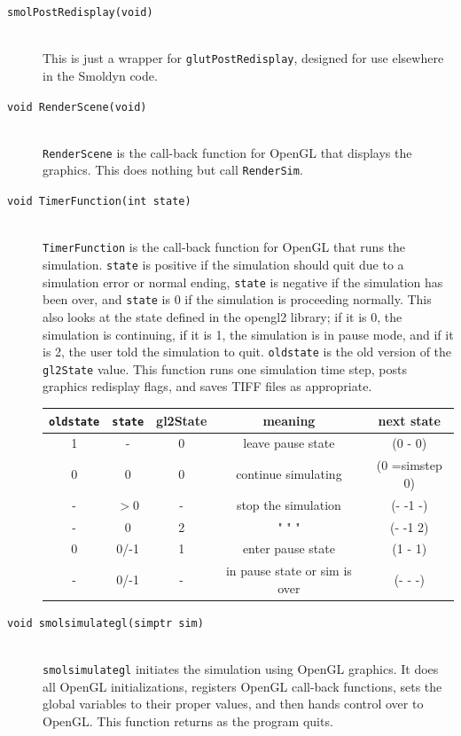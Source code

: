 \documentclass {scrbook}
\newcommand {\ttt} {\texttt}
\begin{document}
\begin{description}
\item[\ttt{smolPostRedisplay(void)}]
\hfill \\
This is just a wrapper for \ttt{glutPostRedisplay}, designed for use elsewhere in the Smoldyn code.

\item[\ttt{void RenderScene(void)}]
\hfill \\
\ttt{RenderScene} is the call-back function for OpenGL that displays the graphics. This does nothing but call \ttt{RenderSim}.

\item[\ttt{void TimerFunction(int state)}]
\hfill \\
\ttt{TimerFunction} is the call-back function for OpenGL that runs the simulation. \ttt{state} is positive if the simulation should quit due to a simulation error or normal ending, \ttt{state} is negative if the simulation has been over, and \ttt{state} is 0 if the simulation is proceeding normally. This also looks at the state defined in the opengl2 library; if it is 0, the simulation is continuing, if it is 1, the simulation is in pause mode, and if it is 2, the user told the simulation to quit. \ttt{oldstate} is the old version of the \ttt{gl2State} value. This function runs one simulation time step, posts graphics redisplay flags, and saves TIFF files as appropriate.

\begin{longtable}[c]{ccccc}
\ttt{oldstate} & \ttt{state} & gl2State & meaning & next state\\
\hline
1 & - & 0 & leave pause state & (0 - 0)\\
0 & 0 & 0 & continue simulating & (0 =simstep 0)\\
- & $>$0 & - & stop the simulation & (- -1 -)\\
- & 0 & 2 &  "    "     " & (- -1 2)\\
0 & 0/-1 & 1 & enter pause state & (1 - 1)\\
- & 0/-1 & - & in pause state or sim is over & (- - -)\\

\end{longtable}

\item[\ttt{void smolsimulategl(simptr sim)}]
\hfill \\
\ttt{smolsimulategl} initiates the simulation using OpenGL graphics. It does all OpenGL initializations, registers OpenGL call-back functions, sets the global variables to their proper values, and then hands control over to OpenGL. This function returns as the program quits.


\end{description}
\end{document}
